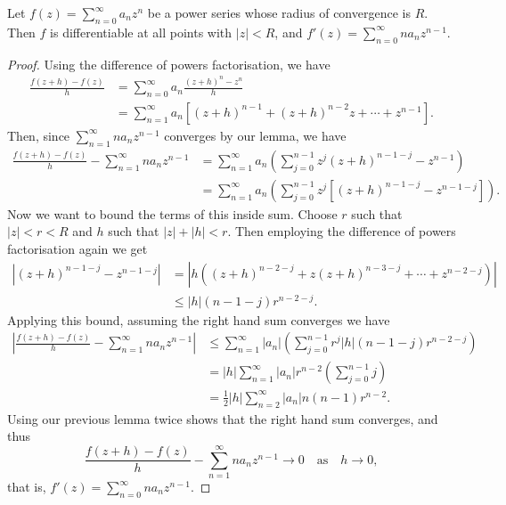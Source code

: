 \documentclass[a4paper]{scrartcl}
\begin{document}
\begin{theorem}
	Let $f(z) = \sum_{n = 0}^{\infty} a_n z^n$ be a power series whose radius of convergence is $R$. Then $f$ is differentiable at all points with $|z| < R$, and
	$
	f'(z) = \sum_{n = 0}^{\infty} n a_n z^{n - 1}.
	$
\end{theorem}
\begin{proof}
	Using the difference of powers factorisation, we have
	\begin{align*}
		\frac{f(z+h)-f(z)}{h}&=\sum_{n=0}^{\infty} a_{n} \frac{(z+h)^{n}-z^{n}}{h}\\&=\sum_{n=1}^{\infty} a_{n}\left[(z+h)^{n-1}+(z+h)^{n-2} z+\cdots+z^{n-1}\right].
	\end{align*}
	Then, since $\sum_{n = 1}^\infty n a_n z^{n - 1}$ converges by our lemma, we have
	\begin{align*}
		\frac{f(z+h)-f(z)}{h}-\sum_{n=1}^{\infty} n a_{n} z^{n-1} &= \sum_{n = 1}^{\infty} a_n \left(\sum_{j=0}^{n-1} z^{j}(z+h)^{n-1-j}-z^{n-1}\right) \\
		&= \sum_{n = 1}^{\infty} a_n \left(\sum_{j=0}^{n-1} z^{j}\left[(z+h)^{n-1-j}-z^{n-1 - j}\right]\right).
	\end{align*}
	Now we want to bound the terms of this inside sum. Choose $r$ such that $|z| < r < R$ and $h$ such that $|z| + |h| < r$. Then 
	employing the difference of powers factorisation again we get
	\begin{align*}
		|(z+h)^{n-1-j}-z^{n-1 - j}| &= |h((z + h)^{n - 2 - j} + z(z + h)^{n - 3 - j} + \cdots + z^{n - 2 - j})| \\
		&\leq |h|(n- 1 - j)r^{n - 2 - j}.
	\end{align*}
Applying this bound, assuming the right hand sum converges we have
\begin{align*}
	\left|\frac{f(z+h)-f(z)}{h}-\sum_{n=1}^{\infty} n a_{n} z^{n-1}\right| &\leq \sum_{n=1}^{\infty}\left|a_{n}\right|\left(\sum_{j=0}^{n-1} r^{j}|h|(n-1-j) r^{n-2-j}\right) \\
	&= |h| \sum_{n=1}^{\infty}\left|a_{n}\right| r^{n-2}\left(\sum_{j=0}^{n-1}j\right) \\
	&= \frac{1}{2}|h| \sum_{n=2}^{\infty}\left|a_{n}\right| n(n-1)r^{n-2}.
\end{align*}
Using our previous lemma twice shows that the right hand sum converges, and thus
$$
\frac{f(z+h)-f(z)}{h}-\sum_{n=1}^{\infty} n a_{n} z^{n-1} \rightarrow 0 \quad \text{as} \quad h \rightarrow 0,
$$
that is,
$
f'(z) = \sum_{n = 0}^{\infty} n a_n z^{n - 1}.
$
\end{proof}
\end{document}
